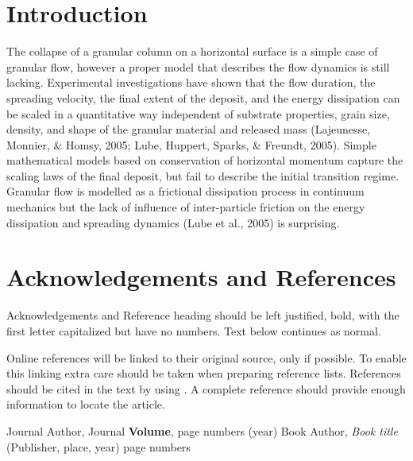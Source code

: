 \documentclass[epj,twocolumn]{webofc}
\begin{document}
\section{Introduction}
The collapse of a granular column on a horizontal surface is a simple case of granular flow, however a
proper model that describes the flow dynamics is still lacking. Experimental investigations have shown that
the flow duration, the spreading velocity, the final extent of the deposit, and the energy dissipation can be scaled in a quantitative way independent of substrate properties, grain size, density, and shape of the granular
material and released mass (Lajeunesse, Monnier, \& Homsy, 2005; Lube, Huppert, Sparks, \& Freundt, 2005).
Simple mathematical models based on conservation of horizontal momentum capture the scaling laws of the
final deposit, but fail to describe the initial transition regime. Granular flow is modelled as a frictional
dissipation process in continuum mechanics but the lack of influence of inter-particle friction on the energy
dissipation and spreading dynamics (Lube et al., 2005) is surprising.

\section*{Acknowledgements and References}
Acknowledgements and Reference heading should be left justified, bold, with the first letter capitalized but have no numbers. Text below continues as normal.

Online references will be linked to their original source, only if possible. To enable this linking extra care should be taken when preparing reference lists. References should be cited in the text by using \cite{RefJ}. A complete reference should provide enough information to locate the article. 

%
% 
%
%
\begin{thebibliography}{}
%
%
Journal Author, Journal \textbf{Volume}, page numbers (year)
Book Author, \textit{Book title} (Publisher, place, year) page numbers
\end{thebibliography}
\end{document}
